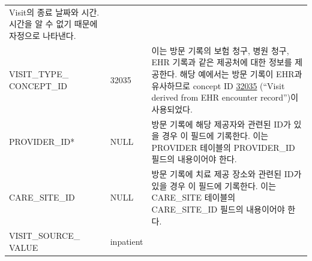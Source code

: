 \documentclass[11pt]{book}
\theoremstyle{definition}
\theoremstyle{definition}
\theoremstyle{definition}
\theoremstyle{remark}
\begin{document}
\begin{longtable}[]{@{}lll@{}}
\begin{minipage}[t]{0.48\columnwidth}
Visit의 종료 날짜와 시간. 시간을 알 수 없기 때문에 자정으로
나타낸다.\strut
\end{minipage}\tabularnewline
\begin{minipage}[t]{0.28\columnwidth}\raggedright\strut
VISIT\_TYPE\_ CONCEPT\_ID\strut
\end{minipage} & \begin{minipage}[t]{0.16\columnwidth}\raggedright\strut
32035\strut
\end{minipage} & \begin{minipage}[t]{0.48\columnwidth}\raggedright\strut
이는 방문 기록의 보험 청구, 병원 청구, EHR 기록과 같은 제공처에 대한
정보를 제공한다. 해당 예에서는 방문 기록이 EHR과 유사하므로 concept ID
\href{http://athena.ohdsi.org/search-terms/terms/32035}{32035} (``Visit
derived from EHR encounter record'')이 사용되었다.\strut
\end{minipage}\tabularnewline
\begin{minipage}[t]{0.28\columnwidth}\raggedright\strut
PROVIDER\_ID*\strut
\end{minipage} & \begin{minipage}[t]{0.16\columnwidth}\raggedright\strut
NULL\strut
\end{minipage} & \begin{minipage}[t]{0.48\columnwidth}\raggedright\strut
방문 기록에 해당 제공자와 관련된 ID가 있을 경우 이 필드에 기록한다. 이는
PROVIDER 테이블의 PROVIDER\_ID 필드의 내용이어야 한다.\strut
\end{minipage}\tabularnewline
\begin{minipage}[t]{0.28\columnwidth}\raggedright\strut
CARE\_SITE\_ID\strut
\end{minipage} & \begin{minipage}[t]{0.16\columnwidth}\raggedright\strut
NULL\strut
\end{minipage} & \begin{minipage}[t]{0.48\columnwidth}\raggedright\strut
방문 기록에 치료 제공 장소와 관련된 ID가 있을 경우 이 필드에 기록한다.
이는 CARE\_SITE 테이블의 CARE\_SITE\_ID 필드의 내용이어야 한다.\strut
\end{minipage}\tabularnewline
\begin{minipage}[t]{0.28\columnwidth}\raggedright\strut
VISIT\_SOURCE\_ VALUE\strut
\end{minipage} & \begin{minipage}[t]{0.16\columnwidth}\raggedright\strut
inpatient\strut
\end{minipage} & \begin{minipage}[t]{0.48\columnwidth}\raggedright\strut

\end{minipage}
\end{longtable}
\end{document}
